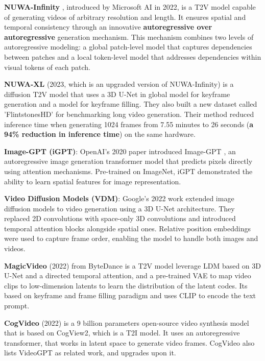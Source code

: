 \textbf{NUWA-Infinity } \cite{nuwa_infinity}, introduced by Microsoft AI in 2022, is a T2V model capable of generating videos of arbitrary resolution and length. It ensures spatial and temporal consistency through an innovative \textbf{autoregressive over autoregressive} generation mechanism. This mechanism combines two levels of autoregressive modeling: a global patch-level model that captures dependencies between patches and a local token-level model that addresses dependencies within visual tokens of each patch.

\textbf{NUWA-XL} \cite{nuwa_xl} (2023, which is an upgraded version of NUWA-Infinity) is a diffusion T2V model that uses a 3D U-Net in global model for keyframe generation and a model for keyframe filling. They also built a new dataset called 'FlintstonesHD' for benchmarking long video generation. Their method reduced inference time when generating 1024 frames from 7.55 minutes to 26 seconds (\textbf{a 94\% reduction in inference time}) on the same hardware.

\textbf{Image-GPT (iGPT)}: OpenAI's 2020 paper introduced Image-GPT \cite{imagegpt}, an autoregressive image generation transformer model that predicts pixels directly using attention mechanisms. Pre-trained on ImageNet, iGPT demonstrated the ability to learn spatial features for image representation.

\textbf{Video Diffusion Models (VDM)}: Google's 2022 work \cite{video_diffusion_models} extended image diffusion models to video generation using a 3D U-Net architecture. They replaced 2D convolutions with space-only 3D convolutions and introduced temporal attention blocks alongside spatial ones. Relative position embeddings were used to capture frame order, enabling the model to handle both images and videos.

\textbf{MagicVideo} (2022) \cite{magic_video} from ByteDance is a T2V model leverage LDM based on 3D U-Net and a directed temporal attention, and a pre-trained VAE to map video clips to low-dimension latents to learn the distribution of the latent codes. Its based on keyframe and frame filling paradigm and uses CLIP to encode the text prompt.

\textbf{CogVideo} (2022) \cite{cogvideo} is a 9 billion parameters open-source video synthesis model that is based on CogView2, which is a T2I model. It uses an autoregressive transformer, that works in latent space to generate video frames. CogVideo also lists VideoGPT as related work, and upgrades upon it.

